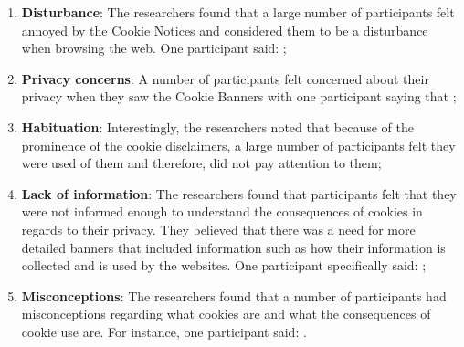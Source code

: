 \documentclass[../main.tex]{subfiles}
\begin{document}
\begin{enumerate}
    \item \textbf{Disturbance}: The researchers found that a large number of participants felt annoyed by the Cookie Notices and considered them to be a disturbance when browsing the web. One participant said: ;
    \item \textbf{Privacy concerns}: A number of participants felt concerned about their privacy when they saw the Cookie Banners with one participant saying that ;
    \item \textbf{Habituation}: Interestingly, the researchers noted that because of the prominence of the cookie disclaimers, a large number of participants felt they were used of them and therefore, did not pay attention to them;
    \item \textbf{Lack of information}: The researchers found that participants felt that they were not informed enough to understand the consequences of cookies in regards to their privacy. They believed that there was a need for more detailed banners that included information such as how their information is collected and is used by the websites. One participant specifically said:  ;
    \item \textbf{Misconceptions}: The researchers found that a number of participants had misconceptions regarding what cookies are and what the consequences of cookie use are. For instance, one participant said: .
\end{enumerate}
\end{document}
